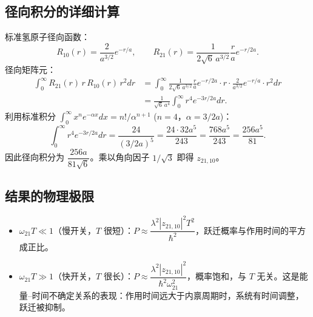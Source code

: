 \subsection{径向积分的详细计算}

\begin{derivationbox}[径向积分的详细计算]
标准氢原子径向函数：
\[
R_{10}(r) = \frac{2}{a^{3/2}} e^{-r/a}, \qquad R_{21}(r) = \frac{1}{2\sqrt{6}\,a^{3/2}} \frac{r}{a} e^{-r/2a}.
\]
径向矩阵元：
\begin{align*}
\int_0^\infty R_{21}(r)\, r\, R_{10}(r)\, r^2 dr
&= \int_0^\infty \frac{1}{2\sqrt{6}\,a^{3/2}} \frac{r}{a} e^{-r/2a} \cdot r \cdot \frac{2}{a^{3/2}} e^{-r/a} \cdot r^2 dr \\
&= \frac{1}{\sqrt{6}\,a^4} \int_0^\infty r^4 e^{-3r/2a} dr.
\end{align*}
利用标准积分 $\int_0^\infty x^n e^{-\alpha x} dx = n!/\alpha^{n+1}$ ($n=4$，$\alpha = 3/2a$)：
\[
\int_0^\infty r^4 e^{-3r/2a} dr = \frac{24}{(3/2a)^5} = \frac{24 \cdot 32 a^5}{243} = \frac{768 a^5}{243} = \frac{256 a^5}{81}.
\]
因此径向积分为 $\dfrac{256a}{81\sqrt{6}}$。乘以角向因子 $1/\sqrt{3}$ 即得 $z_{21,10}$。
\end{derivationbox}

\subsection{结果的物理极限}

\begin{insightbox}[结果的物理极限]
\begin{itemize}
\item $\omega_{21} T \ll 1$（慢开关，$T$ 很短）：$P \approx \dfrac{\lambda^2 |z_{21,10}|^2 T^2}{\hbar^2}$，跃迁概率与作用时间的平方成正比。
\item $\omega_{21} T \gg 1$（快开关，$T$ 很长）：$P \approx \dfrac{\lambda^2 |z_{21,10}|^2}{\hbar^2 \omega_{21}^2}$，概率饱和，与 $T$ 无关。这是能量--时间不确定关系的表现：作用时间远大于内禀周期时，系统有时间调整，跃迁被抑制。
\end{itemize}
\end{insightbox}

